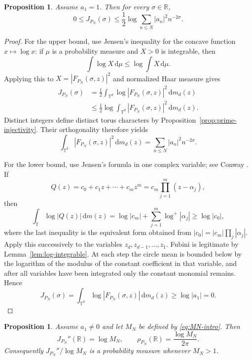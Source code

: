 \documentclass[11pt]{article}
\newtheorem{proposition}[theorem]{Proposition}
\theoremstyle{definition}
\newcommand{\R}{\mathbb R}
\newcommand{\T}{\mathbb T}
\newcommand{\dd}{\,\mathrm d}
\newcommand{\1}{\mathbf 1}
\begin{document}
\begin{proposition}\label{prop:basic-bounds}
Assume $a_1=1$.  Then for every $\sigma\in\R$,
\begin{equation}\label{eq:basic-bounds}
0\le J_{P_N}(\sigma)
\le
\frac12\log\sum_{n\le N}|a_n|^2n^{-2\sigma}.
\end{equation}
\end{proposition}

\begin{proof}
For the upper bound, use Jensen's inequality for the concave function $x\mapsto\log x$: if $\mu$ is a probability measure and $X>0$ is integrable, then
\[
\int\log X\dd\mu\le\log\int X\dd\mu.
\]
Applying this to $X=|F_{P_N}(\sigma,z)|^2$ and normalized Haar measure gives
\begin{align*}
J_{P_N}(\sigma)
&=\frac12\int_{\T^d}\log|F_{P_N}(\sigma,z)|^2\dd m_d(z)\\
&\le\frac12\log\int_{\T^d}|F_{P_N}(\sigma,z)|^2\dd m_d(z).
\end{align*}
Distinct integers define distinct torus characters by Proposition~\ref{prop:prime-injectivity}.  Their orthogonality therefore yields
\[
\int_{\T^d}|F_{P_N}(\sigma,z)|^2\dd m_d(z)
=
\sum_{n\le N}|a_n|^2n^{-2\sigma}.
\]

For the lower bound, use Jensen's formula in one complex variable; see Conway \cite[Chapter~XI, Section~1]{Conway1978}.  If
\[
Q(z)=c_0+c_1z+\cdots+c_mz^m
=c_m\prod_{j=1}^m(z-\alpha_j),
\]
then
\[
\int_{\T}\log|Q(z)|\dd m(z)
=
\log|c_m|+\sum_{j=1}^m\log^+|\alpha_j|
\ge \log|c_0|,
\]
where the last inequality is the equivalent form obtained from
$|c_0|=|c_m|\prod_j|\alpha_j|$.  Apply this successively to the variables $z_d,z_{d-1},\ldots,z_1$.  Fubini is legitimate by Lemma~\ref{lem:log-integrable}.  At each step the circle mean is bounded below by the logarithm of the modulus of the constant coefficient in that variable, and after all variables have been integrated only the constant monomial remains.  Hence
\[
J_{P_N}(\sigma)
=
\int_{\T^d}\log|F_{P_N}(\sigma,z)|\dd m_d(z)
\ge\log|a_1|=0.
\]
\end{proof}

\begin{proposition}\label{prop:total-mass}
Assume $a_1\neq0$ and let $M_N$ be defined by \eqref{eq:MN-intro}.  Then
\begin{equation}\label{eq:totalmass}
J_{P_N}''(\R)=\log M_N,
\qquad
\rho_{P_N}(\R)=\frac{\log M_N}{2\pi}.
\end{equation}
Consequently $J_{P_N}''/\log M_N$ is a probability measure whenever $M_N>1$.
\end{proposition}
\end{document}

